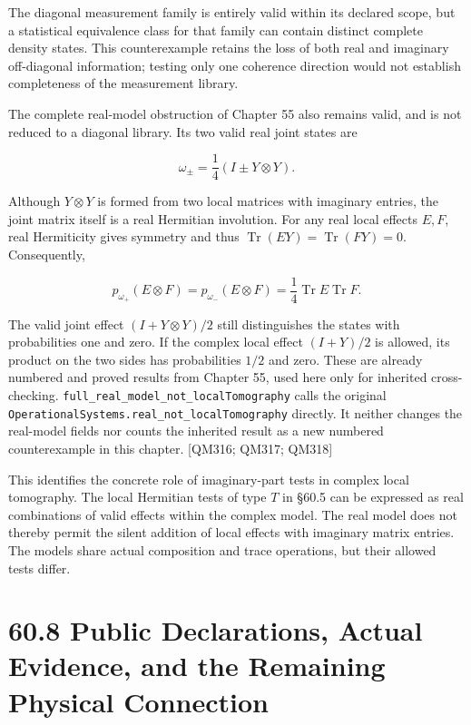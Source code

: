 \documentclass[
  11pt,
  oneside]{book}
\begin{document}
The diagonal measurement family is entirely valid within its declared
scope, but a statistical equivalence class for that family can contain
distinct complete density states. This counterexample retains the loss
of both real and imaginary off-diagonal information; testing only one
coherence direction would not establish completeness of the measurement
library.

The complete real-model obstruction of Chapter 55 also remains valid,
and is not reduced to a diagonal library. Its two valid real joint
states are

\[
\omega_\pm=\frac14(I\pm Y\otimes Y).
\]

Although \(Y\otimes Y\) is formed from two local matrices with imaginary
entries, the joint matrix itself is a real Hermitian involution. For any
real local effects \(E,F\), real Hermiticity gives symmetry and thus
\(\operatorname{Tr}(EY)=\operatorname{Tr}(FY)=0\). Consequently,

\[
p_{\omega_+}(E\otimes F)
=p_{\omega_-}(E\otimes F)
=\frac14\operatorname{Tr}E\operatorname{Tr}F.
\]

The valid joint effect \((I+Y\otimes Y)/2\) still distinguishes the
states with probabilities one and zero. If the complex local effect
\((I+Y)/2\) is allowed, its product on the two sides has probabilities
\(1/2\) and zero. These are already numbered and proved results from
Chapter 55, used here only for inherited cross-checking.
\texttt{full\_\allowbreak real\_\allowbreak model\_\allowbreak not\_\allowbreak local\allowbreak Tomography} calls the original
\texttt{Operational\allowbreak Systems.\allowbreak real\_\allowbreak not\_\allowbreak local\allowbreak Tomography} directly. It
neither changes the real-model fields nor counts the inherited result as
a new numbered counterexample in this chapter. {[}QM316; QM317; QM318{]}

This identifies the concrete role of imaginary-part tests in complex
local tomography. The local Hermitian tests of type \(T\) in §60.5 can
be expressed as real combinations of valid effects within the complex
model. The real model does not thereby permit the silent addition of
local effects with imaginary matrix entries. The models share actual
composition and trace operations, but their allowed tests differ.

\section{60.8 Public Declarations, Actual Evidence, and the Remaining
Physical Connection}
\end{document}
